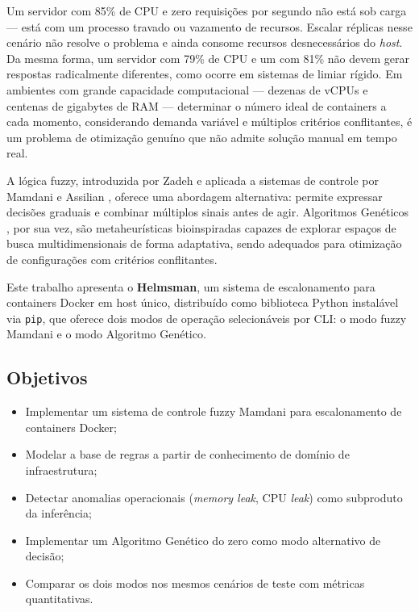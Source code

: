 \documentclass[12pt, a4paper]{article}
\begin{document}
Um servidor com 85\% de CPU e zero requisições por segundo não está sob carga — está com um processo travado ou vazamento de recursos. Escalar réplicas nesse cenário não resolve o problema e ainda consome recursos desnecessários do \textit{host}. Da mesma forma, um servidor com 79\% de CPU e um com 81\% não devem gerar respostas radicalmente diferentes, como ocorre em sistemas de limiar rígido. Em ambientes com grande capacidade computacional — dezenas de vCPUs e centenas de gigabytes de RAM — determinar o número ideal de containers a cada momento, considerando demanda variável e múltiplos critérios conflitantes, é um problema de otimização genuíno que não admite solução manual em tempo real.

A lógica fuzzy, introduzida por Zadeh \cite{zadeh1965} e aplicada a sistemas de controle por Mamdani e Assilian \cite{mamdani1975}, oferece uma abordagem alternativa: permite expressar decisões graduais e combinar múltiplos sinais antes de agir. Algoritmos Genéticos \cite{holland1975}, por sua vez, são metaheurísticas bioinspiradas capazes de explorar espaços de busca multidimensionais de forma adaptativa, sendo adequados para otimização de configurações com critérios conflitantes.

Este trabalho apresenta o \textbf{Helmsman}, um sistema de escalonamento para containers Docker em host único, distribuído como biblioteca Python instalável via \texttt{pip}, que oferece dois modos de operação selecionáveis por CLI: o modo fuzzy Mamdani e o modo Algoritmo Genético.

\subsection{Objetivos}

\begin{itemize}
  \item Implementar um sistema de controle fuzzy Mamdani para escalonamento de containers Docker;
  \item Modelar a base de regras a partir de conhecimento de domínio de infraestrutura;
  \item Detectar anomalias operacionais (\textit{memory leak}, CPU \textit{leak}) como subproduto da inferência;
  \item Implementar um Algoritmo Genético do zero como modo alternativo de decisão;
  \item Comparar os dois modos nos mesmos cenários de teste com métricas quantitativas.
\end{itemize}
\end{document}
